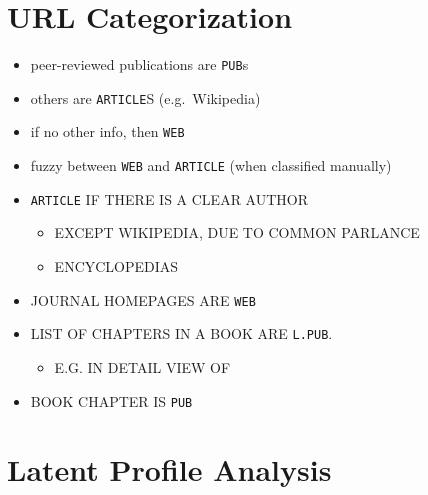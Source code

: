 \documentclass[letterpaper, nobind]{templates/ociamthesis}
\providecommand{\tightlist}{%
  \setlength{\itemsep}{0pt}\setlength{\parskip}{0pt}}
\begin{document}
\hypertarget{url-categorization}{%
\section{URL Categorization}\label{url-categorization}}

\begin{itemize}
\tightlist
\item
  peer-reviewed publications are \texttt{PUB}s
\item
  others are \texttt{ARTICLE}S (e.g.~Wikipedia)
\item
  if no other info, then \texttt{WEB}
\item
  fuzzy between \texttt{WEB} and \texttt{ARTICLE} (when classified manually)
\item
  \texttt{ARTICLE} IF THERE IS A CLEAR AUTHOR

  \begin{itemize}
  \tightlist
  \item
    EXCEPT WIKIPEDIA, DUE TO COMMON PARLANCE
  \item
    ENCYCLOPEDIAS
  \end{itemize}
\item
  JOURNAL HOMEPAGES ARE \texttt{WEB}
\item
  LIST OF CHAPTERS IN A BOOK ARE \texttt{L.PUB}.

  \begin{itemize}
  \tightlist
  \item
    E.G. IN DETAIL VIEW OF
  \end{itemize}
\item
  BOOK CHAPTER IS \texttt{PUB}
\end{itemize}

\hypertarget{latent-profile-analysis}{%
\section{Latent Profile Analysis}\label{latent-profile-analysis}}
\end{document}
